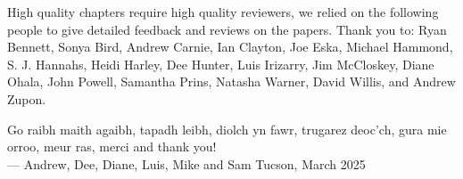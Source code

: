 
High quality chapters require high quality reviewers, we relied on the following people to give detailed feedback and reviews on the papers. Thank you to: Ryan Bennett, Sonya Bird, Andrew Carnie, Ian Clayton, Joe Eska, Michael Hammond, S. J. Hannahs, Heidi Harley, Dee Hunter, Luis Irizarry, Jim McCloskey, Diane Ohala, John Powell, Samantha Prins, Natasha Warner, David Willis, and Andrew Zupon.

Go raibh maith agaibh, tapadh leibh, diolch yn fawr, trugarez deoc'ch, gura mie orroo, meur ras, merci and thank you!\bigskip\\
\noindent --- Andrew, Dee, Diane, Luis, Mike and Sam \hfill
Tucson, March 2025
